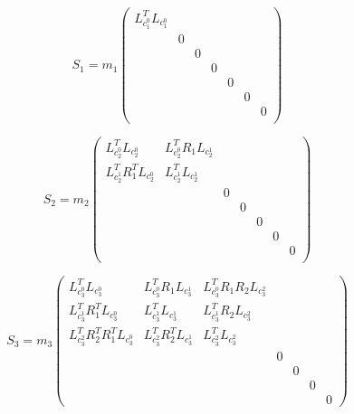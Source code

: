 {\begin{equation*}
    S_1 = m_1
    \begin{pmatrix}
         L_{c_1^0}^T L_{c_1^0} &  &  &  &  &  & \\
          & 0 &  &  &  &  & \\
          &  & 0 &  &  &  & \\
          &  &  & 0 &  &  & \\
          &  &  &  & 0 &  & \\
          &  &  &  &  & 0 & \\
          &  &  &  &  &  & 0\\
    \end{pmatrix}
\end{equation*}


\begin{equation*}
    S_2 = m_2
    \begin{pmatrix}
         L_{c_2^0}^T L_{c_2^0} & L_{c_2^0}^T R_1 L_{c_2^1} &  &  &  &  & \\
         L_{c_2^1}^T R_1^T L_{c_2^0} & L_{c_2^1}^T L_{c_2^1} & &  &  &  & \\
          &  & 0 &  &  &  & \\
          &  &  & 0 &  &  & \\
          &  &  &  & 0 &  & \\
          &  &  &  &  & 0 & \\
          &  &  &  &  &  & 0\\
    \end{pmatrix}
\end{equation*}

\begin{equation*}
    S_3 = m_3
    \begin{pmatrix}
         L_{c_3^0}^T L_{c_3^0} & L_{c_3^0}^T R_1 L_{c_3^1} & L_{c_3^0}^T R_1 R_2 L_{c_3^2} &  &  &  & \\
         L_{c_3^1}^T R_1^T L_{c_3^0} & L_{c_3^1}^T L_{c_3^1} & L_{c_3^1}^T R_2 L_{c_3^2}  &  &  &  & \\
         L_{c_3^2}^T R_2^T R_1^T L_{c_3^0} & L_{c_3^2}^T R_2^T L_{c_3^1} & L_{c_3^2}^T L_{c_3^2} &  &  &  & \\
          &  &  & 0 &  &  & \\
          &  &  &  & 0 &  & \\
          &  &  &  &  & 0 & \\
          &  &  &  &  &  & 0
    \end{pmatrix}
\end{equation*}

}
